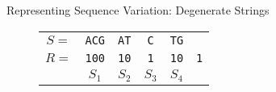 \begin{frame}{Representing Sequence Variation: Degenerate Strings}
\begin{figure}[h!]
{\begin{tabular}{c@{\hskip 0.5em}c@{\hskip 0.5em}c@{\hskip 0.5em}c@{\hskip 0.5em}c@{\hskip 0.5em}c}
                $S =$  & \texttt{ACG} & \texttt{AT} & \texttt{C} & \texttt{TG} &            \\
                $R = $ & \texttt{100} & \texttt{10} & \texttt{1} & \texttt{10} & \texttt{1} \\
                       & $S_1$        & $S_2$       & $S_3$      & $S_4$
            \end{tabular}
        }
    \end{figure}
\end{frame}






